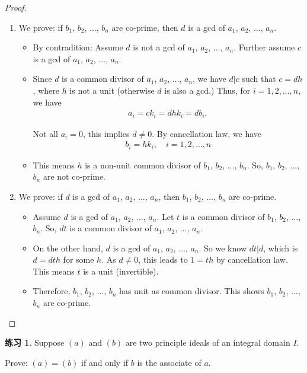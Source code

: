 \documentclass[utf8]{ctexbook}
\theoremstyle{definition}
\newtheorem{exercise}{练习}[section]
\begin{document}
\begin{proof}
\begin{enumerate}
\item{We prove: if $b_1$, $b_2$, $\ldots$, $b_n$ are co-prime, then $d$ is a gcd of $a_1$, $a_2$, $\ldots$, $a_n$.
\begin{itemize}
\item{By contradition: Assume $d$ is not a gcd of $a_1$, $a_2$, $\ldots$, $a_n$. Further assume $c$ is a gcd of $a_1$, $a_2$, $\ldots$, $a_n$.} 
\item{
Since $d$ is a common divisor of $a_1$, $a_2$, $\ldots$, $a_n$, we have $d | c$ such that $c = dh$, where $h$ is not a unit (otherwise $d$ is also a gcd.) Thus, for $i=1,2,\ldots, n$, we have
\begin{align*}
a_i = c k_i = d h k_i = d b_i, 
\end{align*}

Not all $a_i = 0$, this implies $d \neq 0$. By cancellation law, we have 
\begin{align*}
b_i = h k_i, \quad i = 1, 2, \ldots, n
\end{align*}
}
\item{This means $h$ is a non-unit common divisor of $b_1$, $b_2$, $\ldots$, $b_n$. So, $b_1$, $b_2$, $\ldots$, $b_n$ are not co-prime.}
\end{itemize}
}
\item{We prove: if $d$ is a gcd of $a_1$, $a_2$, $\ldots$, $a_n$, then $b_1$, $b_2$, $\ldots$, $b_n$ are co-prime.}
\begin{itemize}
\item{Assume $d$ is a gcd of $a_1$, $a_2$, $\ldots$, $a_n$. Let $t$ is a common divisor of $b_1$, $b_2$, $\ldots$, $b_n$. So, $dt$ is a common divisor of $a_1$, $a_2$, $\ldots$, $a_n$.}
\item{On the other hand, $d$ is a gcd of $a_1$, $a_2$, $\ldots$, $a_n$. So we know $dt | d$, which is $d = dt h$ for some $h$. As $d \neq 0 $, this leads to $1 = t h$ by cancellation law. This means $t$ is a unit (invertible). 
}
\item{Therefore, $b_1$, $b_2$, $\ldots$, $b_n$ has unit as common divisor. This shows $b_1$, $b_2$, $\ldots$, $b_n$ are co-prime.}
\end{itemize}
\end{enumerate}


\end{proof}

\begin{exercise}\label{exercise_3_2_2_two_principle_ideals_associate}
Suppose $(a)$ and $(b)$ are two principle ideals of an integral domain $I$.

Prove: $(a) =(b)$ if and only if $b$ is the associate of $a$.
\end{exercise}
\end{document}
